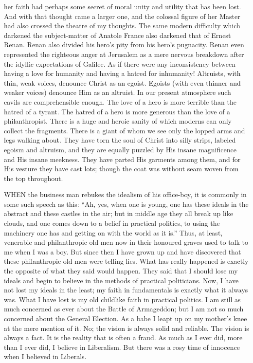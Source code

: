 her faith had perhaps some secret of moral unity and utility that has been lost. And with that thought came a larger one, and the colossal figure of her Master had also crossed the theatre of my thoughts. The same modern difficulty which darkened the subject-matter of Anatole France also darkened that of Ernest Renan. Renan also divided his hero’s pity from his hero’s pugnacity. Renan even represented the righteous anger at Jerusalem as a mere nervous breakdown after the idyllic expectations of Galilee. As if there were any inconsistency between having a love for humanity and having a hatred for inhumanity! Altruists, with thin, weak voices, denounce Christ as an egoist. Egoists (with even thinner and weaker voices) denounce Him as an altruist. In our present atmosphere such cavils are comprehensible enough. The love of a hero is more terrible than the hatred of a tyrant. The hatred of a hero is more generous than the love of a philanthropist. There is a huge and heroic sanity of which moderns can only collect the fragments. There is a giant of whom we see only the lopped arms and legs walking about. They have torn the soul of Christ into silly strips, labeled egoism and altruism, and they are equally puzzled by His insane magnificence and His insane meekness. They have parted His garments among them, and for His vesture they have cast lots; though the coat was without seam woven from the top throughout.


WHEN the business man rebukes the idealism of his office-boy, it is commonly in some such speech as this: “Ah, yes, when one is young, one has these ideals in the abstract and these castles in the air; but in middle age they all break up like clouds, and one comes down to a belief in practical politics, to using the machinery one has and getting on with the world as it is.” Thus, at least, venerable and philanthropic old men now in their honoured graves used to talk to me when I was a boy. But since then I have grown up and have discovered that these philanthropic old men were telling lies. What has really happened is exactly the opposite of what they said would happen. They said that I should lose my ideals and begin to believe in the methods of practical politicians. Now, I have not lost my ideals in the least; my faith in fundamentals is exactly what it always was. What I have lost is my old childlike faith in practical politics. I am still as much concerned as ever about the Battle of Armageddon; but I am not so much concerned about the General Election. As a babe I leapt up on my mother’s knee at the mere mention of it. No; the vision is always solid and reliable. The vision is always a fact. It is the reality that is often a fraud. As much as I ever did, more than I ever did, I believe in Liberalism. But there was a rosy time of innocence when I believed in Liberals.

